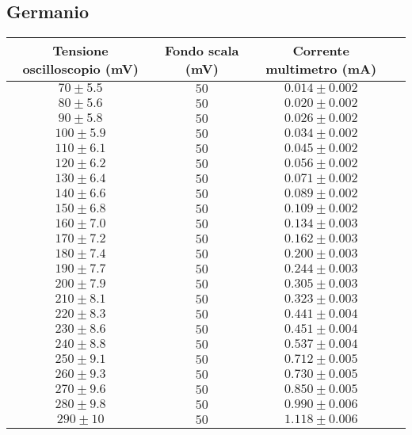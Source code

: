 \documentclass[]{article}
\begin{document}
\subsection{Germanio}
\begin{center}
	\begin{tabular}{|c|c|c|c|}
		\hline
		Tensione oscilloscopio (mV)& Fondo scala (mV) & Corrente multimetro (mA) \\
		\hline
		$ 70\pm 5.5 $ &$ 50 $ & $ 0.014\pm 0.002 $ \\
		\hline
		$ 80\pm 5.6$ &$ 50 $ & $ 0.020\pm 0.002 $ \\
		\hline
		$ 90\pm 5.8$ &$ 50 $ & $ 0.026\pm 0.002 $ \\
		\hline
		$ 100\pm 5.9 $ &$ 50 $ & $ 0.034\pm 0.002 $ \\
		\hline
		$110\pm 6.1 $ &$ 50 $ & $ 0.045\pm 0.002 $ \\
		\hline
		$ 120\pm 6.2 $ &$ 50 $ & $ 0.056\pm 0.002 $ \\
		\hline
		$ 130\pm 6.4$ &$ 50 $ & $ 0.071\pm 0.002 $ \\
		\hline
		$ 140\pm 6.6$ &$ 50 $ & $ 0.089\pm 0.002 $ \\
		\hline
		$ 150\pm 6.8$ &$ 50 $ & $ 0.109\pm 0.002 $ \\
		\hline
		$ 160\pm 7.0$ &$ 50 $ & $ 0.134\pm 0.003 $ \\
		\hline
		$ 170\pm 7.2$ &$ 50 $ & $ 0.162\pm 0.003 $ \\
		\hline
		$ 180\pm 7.4$ &$ 50 $ & $ 0.200\pm 0.003 $ \\
		\hline
		$ 190\pm 7.7$ &$ 50 $ & $ 0.244\pm 0.003 $ \\
		\hline
		$ 200\pm 7.9$ &$ 50 $ & $ 0.305\pm 0.003 $ \\
		\hline
		$ 210\pm 8.1$ &$ 50 $ & $ 0.323\pm 0.003 $ \\
		\hline
		$ 220\pm 8.3$ &$ 50 $ & $ 0.441\pm 0.004 $ \\
		\hline
		$ 230\pm 8.6$ &$ 50 $ & $ 0.451\pm 0.004 $ \\
		\hline
		$ 240\pm 8.8$ &$ 50 $ & $ 0.537\pm 0.004 $ \\
		\hline
		$ 250\pm 9.1$ &$ 50 $ & $ 0.712\pm 0.005 $ \\
		\hline
		$ 260\pm 9.3$ &$ 50 $ & $ 0.730\pm 0.005 $ \\
		\hline
		$ 270\pm 9.6$ &$ 50 $ & $ 0.850\pm 0.005 $ \\
		\hline
		$ 280\pm 9.8$ &$ 50 $ & $ 0.990\pm 0.006 $ \\
		\hline
		$ 290\pm 10$ &$ 50 $ & $ 1.118\pm 0.006 $ \\
		\hline
	\end{tabular}
\end{center}
\end{document}
